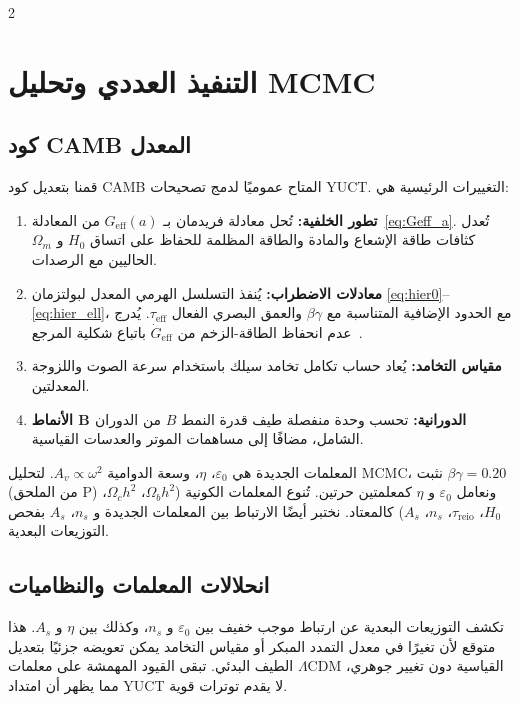 \documentclass[11pt,a4paper]{article}
\begin{document}
	\begin{multicols}{2}
		
		\section{التنفيذ العددي وتحليل MCMC}
		
		\subsection{كود CAMB المعدل}
		
		قمنا بتعديل كود CAMB المتاح عموميًا \cite{Lewis2000} لدمج تصحيحات YUCT. التغييرات الرئيسية هي:
		\begin{enumerate}
			\item \textbf{تطور الخلفية:} تُحل معادلة فريدمان بـ $G_{\mathrm{eff}}(a)$ من المعادلة~\eqref{eq:Geff_a}. تُعدل كثافات طاقة الإشعاع والمادة والطاقة المظلمة للحفاظ على اتساق $H_0$ و $\Omega_m$ الحاليين مع الرصدات.
			\item \textbf{معادلات الاضطراب:} يُنفذ التسلسل الهرمي المعدل لبولتزمان \eqref{eq:hier0}--\eqref{eq:hier_ell}، مع الحدود الإضافية المتناسبة مع $\beta\gamma$ والعمق البصري الفعال $\tau_{\mathrm{eff}}$. يُدرج عدم انحفاظ الطاقة-الزخم من $\dot{G}_{\mathrm{eff}}$ باتباع شكلية المرجع~\cite{Uzan2011}.
			\item \textbf{مقياس التخامد:} يُعاد حساب تكامل تخامد سيلك باستخدام سرعة الصوت واللزوجة المعدلتين.
			\item \textbf{الأنماط B الدورانية:} تحسب وحدة منفصلة طيف قدرة النمط $B$ من الدوران الشامل، مضافًا إلى مساهمات الموتر والعدسات القياسية.
		\end{enumerate}
		المعلمات الجديدة هي $\varepsilon_0$، $\eta$، وسعة الدوامية $A_v \propto \omega^2$. لتحليل MCMC، نثبت $\beta\gamma = 0.20$ (من الملحق P) ونعامل $\varepsilon_0$ و $\eta$ كمعلمتين حرتين. تُنوع المعلمات الكونية ($\Omega_b h^2$، $\Omega_c h^2$، $H_0$، $\tau_{\mathrm{reio}}$، $n_s$، $A_s$) كالمعتاد. نختبر أيضًا الارتباط بين المعلمات الجديدة و $n_s$، $A_s$ بفحص التوزيعات البعدية.
		
		\subsection{انحلالات المعلمات والنظاميات}
		
		تكشف التوزيعات البعدية عن ارتباط موجب خفيف بين $\varepsilon_0$ و $n_s$، وكذلك بين $\eta$ و $A_s$. هذا متوقع لأن تغيرًا في معدل التمدد المبكر أو مقياس التخامد يمكن تعويضه جزئيًا بتعديل الطيف البدئي. تبقى القيود المهمشة على معلمات $\Lambda$CDM القياسية دون تغيير جوهري، مما يظهر أن امتداد YUCT لا يقدم توترات قوية.
		

\end{multicols}
\end{document}

